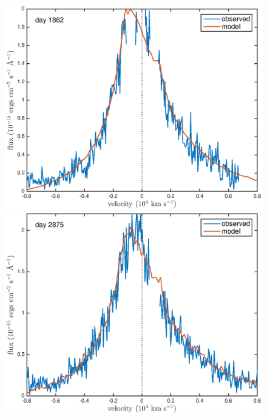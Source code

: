 \documentclass[useAMS,usenatbib,usegraphicx]{mnras}
\begin{document}


\begin{figure}

\includegraphics[trim =33 10 45 15,clip=true,scale=0.35]{clump_1/maximum/d1862Ha}
\includegraphics[trim =55 10 45 15,clip=true,scale=0.35]{clump_1/maximum/d2875Ha}

\end{figure}
\end{document}
